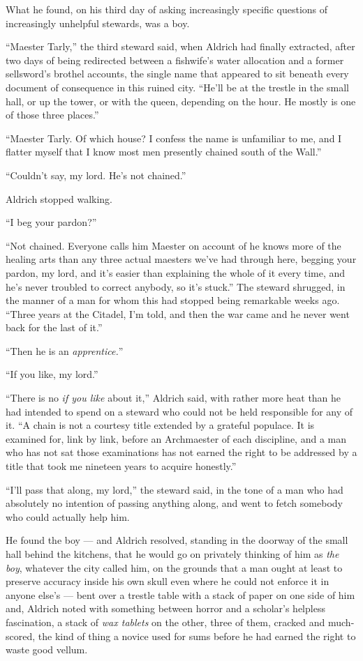 What he found, on his third day of asking increasingly specific questions of increasingly unhelpful stewards, was a boy.

“Maester Tarly,” the third steward said, when Aldrich had finally extracted, after two days of being redirected between a fishwife’s water allocation and a former sellsword’s brothel accounts, the single name that appeared to sit beneath every document of consequence in this ruined city. “He’ll be at the trestle in the small hall, or up the tower, or with the queen, depending on the hour. He mostly is one of those three places.”

“Maester Tarly. Of which house? I confess the name is unfamiliar to me, and I flatter myself that I know most men presently chained south of the Wall.”

“Couldn’t say, my lord. He’s not chained.”

Aldrich stopped walking.

“I beg your pardon?”

“Not chained. Everyone calls him Maester on account of he knows more of the healing arts than any three actual maesters we’ve had through here, begging your pardon, my lord, and it’s easier than explaining the whole of it every time, and he’s never troubled to correct anybody, so it’s stuck.” The steward shrugged, in the manner of a man for whom this had stopped being remarkable weeks ago. “Three years at the Citadel, I’m told, and then the war came and he never went back for the last of it.”

“Then he is an \textit{apprentice.}”

“If you like, my lord.”

“There is no \textit{if you like} about it,” Aldrich said, with rather more heat than he had intended to spend on a steward who could not be held responsible for any of it. “A chain is not a courtesy title extended by a grateful populace. It is examined for, link by link, before an Archmaester of each discipline, and a man who has not sat those examinations has not earned the right to be addressed by a title that took me nineteen years to acquire honestly.”

“I’ll pass that along, my lord,” the steward said, in the tone of a man who had absolutely no intention of passing anything along, and went to fetch somebody who could actually help him.

\sceneBreak

He found the boy — and Aldrich resolved, standing in the doorway of the small hall behind the kitchens, that he would go on privately thinking of him as \textit{the boy}, whatever the city called him, on the grounds that a man ought at least to preserve accuracy inside his own skull even where he could not enforce it in anyone else’s — bent over a trestle table with a stack of paper on one side of him and, Aldrich noted with something between horror and a scholar’s helpless fascination, a stack of \textit{wax tablets} on the other, three of them, cracked and much-scored, the kind of thing a novice used for sums before he had earned the right to waste good vellum.

